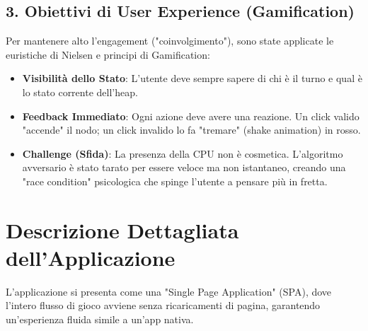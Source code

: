\documentclass[openany]{theme/uniprthesis}
\begin{document}
\subsection{3. Obiettivi di User Experience (Gamification)}
Per mantenere alto l'engagement ("coinvolgimento"), sono state applicate le euristiche di Nielsen e principi di Gamification:
\begin{itemize}
    \item \textbf{Visibilità dello Stato}: L'utente deve sempre sapere di chi è il turno e qual è lo stato corrente dell'heap.
    \item \textbf{Feedback Immediato}: Ogni azione deve avere una reazione. Un click valido "accende" il nodo; un click invalido lo fa "tremare" (shake animation) in rosso.
    \item \textbf{Challenge (Sfida)}: La presenza della CPU non è cosmetica. L'algoritmo avversario è stato tarato per essere veloce ma non istantaneo, creando una "race condition" psicologica che spinge l'utente a pensare più in fretta.
\end{itemize}

\section{Descrizione Dettagliata dell'Applicazione}
L'applicazione si presenta come una "Single Page Application" (SPA), dove l'intero flusso di gioco avviene senza ricaricamenti di pagina, garantendo un'esperienza fluida simile a un'app nativa.
\end{document}
